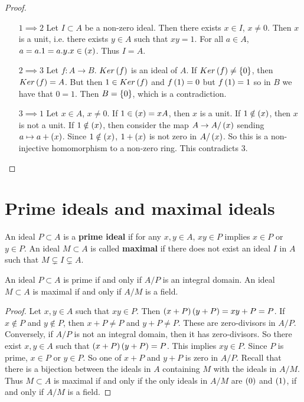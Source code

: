 \begin{proof}
\hfill
\begin{itemize}[leftmargin=0.5in]
\item[$ 1 \implies 2 $] Let $ I \subset A $ be a non-zero ideal. Then there exists $ x \in I $, $ x \ne 0 $. Then $ x $ is a unit, i.e. there exists $ y \in A $ such that $ xy = 1 $. For all $ a \in A $, $ a = a.1 = a.y.x \in \left( x \right) $. Thus $ I = A $.
\item[$ 2 \implies 3 $] Let $ f : A \to B $. $ Ker\left( f \right) $ is an ideal of $ A $. If $ Ker\left( f \right) \ne \left\{ 0 \right\} $, then $ Ker\left( f \right) = A $. But then $ 1 \in Ker\left( f \right) $ and $ f\left( 1 \right) = 0 $ but $ f\left( 1 \right) = 1 $ so in $ B $ we have that $ 0 = 1 $. Then $ B = \left\{ 0 \right\} $, which is a contradiction.
\item[$ 3 \implies 1 $] Let $ x \in A $, $ x \ne 0 $. If $ 1 \in \left( x \right) = xA $, then $ x $ is a unit. If $ 1 \notin \left( x \right) $, then $ x $ is not a unit. If $ 1 \notin \left( x \right) $, then consider the map $ A \to A / \left( x \right) $ sending $ a \mapsto a + \left( x \right) $. Since $ 1 \notin \left( x \right) $, $ 1 + \left( x \right) $ is not zero in $ A / \left( x \right) $. So this is a non-injective homomorphism to a non-zero ring. This contradicts $ 3 $.
\end{itemize}
\end{proof}

\pagebreak

\section{Prime ideals and maximal ideals}

\begin{definition}
An ideal $ P \subset A $ is a \textbf{prime ideal} if for any $ x, y \in A $, $ xy \in P $ implies $ x \in P $ or $ y \in P $. An ideal $ M \subset A $ is called \textbf{maximal} if there does not exist an ideal $ I $ in $ A $ such that $ M \subsetneq I \subsetneq A $.
\end{definition}

\begin{lemma}
An ideal $ P \subset A $ is prime if and only if $ A / P $ is an integral domain. An ideal $ M \subset A $ is maximal if and only if $ A / M $ is a field.
\end{lemma}

\begin{proof}
Let $ x, y \in A $ such that $ xy \in P $. Then $ \left( x + P \right)\left( y + P \right) = xy + P = P $. If $ x \notin P $ and $ y \notin P $, then $ x + P \ne P $ and $ y + P \ne P $. These are zero-divisors in $ A / P $. Conversely, if $ A / P $ is not an integral domain, then it has zero-divisors. So there exist $ x, y \in A $ such that $ \left( x + P \right)\left( y + P \right) = P $. This implies $ xy \in P $. Since $ P $ is prime, $ x \in P $ or $ y \in P $. So one of $ x + P $ and $ y + P $ is zero in $ A / P $. Recall that there is a bijection between the ideals in $ A $ containing $ M $ with the ideals in $ A / M $. Thus $ M \subset A $ is maximal if and only if the only ideals in $ A / M $ are $ \left( 0 \right) $ and $ \left( 1 \right) $, if and only if $ A / M $ is a field.
\end{proof}

